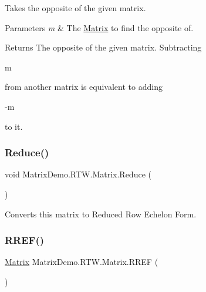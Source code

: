 Takes the opposite of the given matrix. 


\begin{DoxyParams}{Parameters}
{\em m} & The \mbox{\hyperlink{class_matrix_demo_1_1_r_t_w_1_1_matrix}{Matrix}} to find the opposite of.\\
\hline
\end{DoxyParams}
\begin{DoxyReturn}{Returns}
The opposite of the given matrix. Subtracting 
\begin{DoxyCode}
m
\end{DoxyCode}
 from another matrix is equivalent to adding 
\begin{DoxyCode}
-m
\end{DoxyCode}
 to it.
\end{DoxyReturn}
\mbox{\label{class_matrix_demo_1_1_r_t_w_1_1_matrix_a14fc1e8ce8136690364961901e7becf6}} 
\subsubsection{\texorpdfstring{Reduce()}{Reduce()}}
{\footnotesize\ttfamily void Matrix\+Demo.\+R\+T\+W.\+Matrix.\+Reduce (\begin{DoxyParamCaption}{ }\end{DoxyParamCaption})}



Converts this matrix to Reduced Row Echelon Form. 

\mbox{\label{class_matrix_demo_1_1_r_t_w_1_1_matrix_ab5b22330a32e73b322522e9c60b8502e}} 
\subsubsection{\texorpdfstring{R\+R\+E\+F()}{RREF()}}
{\footnotesize\ttfamily \mbox{\hyperlink{class_matrix_demo_1_1_r_t_w_1_1_matrix}{Matrix}} Matrix\+Demo.\+R\+T\+W.\+Matrix.\+R\+R\+EF (\begin{DoxyParamCaption}{ }\end{DoxyParamCaption})}



